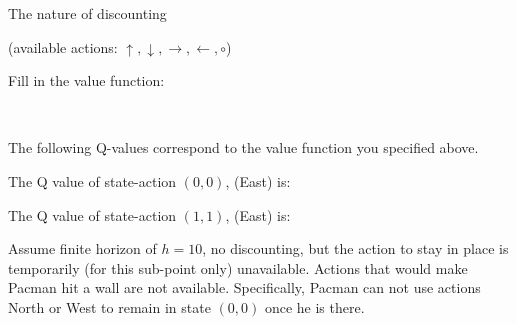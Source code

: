 \begin{problem}[]{The nature of discounting}
\begin{question}[6]
{\begin{minipage}[t]{.5\textwidth}
(available actions: $\uparrow, \downarrow, \rightarrow, \leftarrow, \circ$)
\end{minipage}
\begin{minipage}[t]{.5\textwidth}
\centering

Fill in the value function:

\end{minipage}}\\

\end{question}

\begin{question}
The following Q-values correspond to the value function you specified above.\\

\begin{subquestion}[2]
The Q value of state-action $(0,0)$, (East) is: \underline{\hspace{1cm}\TwoBi\hspace{1cm}}
\end{subquestion}

\begin{subquestion}[2]
The Q value of state-action $(1,1)$, (East) is: \underline{\hspace{1cm}\TwoBii\hspace{1cm}}
\end{subquestion}

\end{question}


\begin{question}
Assume finite horizon of $h = 10$, no discounting, but the action to stay in place is temporarily (for this sub-point only) unavailable. Actions that would make Pacman hit a wall are not available. Specifically, Pacman can not use actions North or West to remain in state $(0,0)$ once he is there.
\\


\end{question}
\end{problem}
